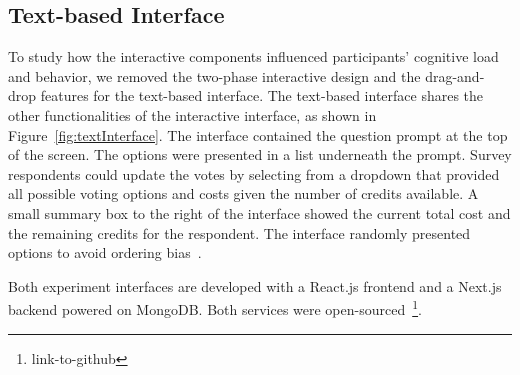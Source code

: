 \subsection{Text-based Interface} To study how the interactive components influenced participants' cognitive load and behavior, we removed the two-phase interactive design and the drag-and-drop features for the text-based interface. The text-based interface shares the other functionalities of the interactive interface, as shown in Figure~\ref{fig:textInterface}. The interface contained the question prompt at the top of the screen. The options were presented in a list underneath the prompt. Survey respondents could update the votes by selecting from a dropdown that provided all possible voting options and costs given the number of credits available. A small summary box to the right of the interface showed the current total cost and the remaining credits for the respondent. The interface randomly presented options to avoid ordering bias~\cite{ferberOrderBiasMail1952, couperWebSurveyDesign2001}.

Both experiment interfaces are developed with a React.js frontend and a Next.js backend powered on MongoDB. Both services were open-sourced~\footnote{link-to-github}.







